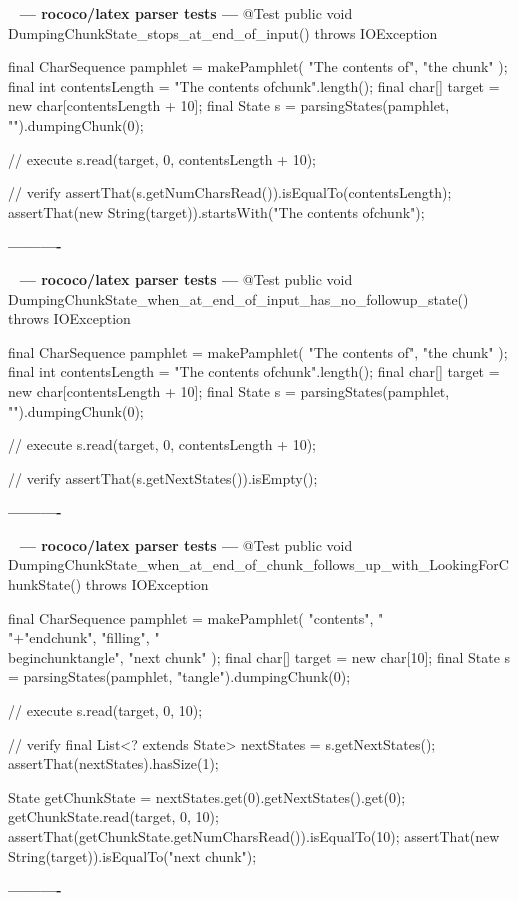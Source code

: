 \documentclass{book}
\newenvironment{chunk}[1]{%
{\ }\newline\noindent%
\hbox{\hskip 2.0cm}{\bf --- #1 ---}%
\verbatim}%                               say exactly what we see
{\endverbatim%
\par{}%
\noindent{}%
\hbox{\hskip 2.0cm}{\bf ----------}%
\par%
\normalsize\noindent}%
\begin{document}
\begin{chunk}{rococo/latex parser tests}
@Test
public void DumpingChunkState_stops_at_end_of_input() throws IOException {
    final CharSequence pamphlet = makePamphlet(
            "The contents of",
            "the chunk"
    );
    final int contentsLength = "The contents of\nthe chunk\n".length();
    final char[] target = new char[contentsLength + 10];
    final State s = parsingStates(pamphlet, "").dumpingChunk(0);

    // execute
    s.read(target, 0, contentsLength + 10);

    // verify
    assertThat(s.getNumCharsRead()).isEqualTo(contentsLength);
    assertThat(new String(target)).startsWith("The contents of\nthe chunk\n");
}
\end{chunk}

\begin{chunk}{rococo/latex parser tests}
@Test
public void DumpingChunkState_when_at_end_of_input_has_no_followup_state() throws IOException {
    final CharSequence pamphlet = makePamphlet(
            "The contents of",
            "the chunk"
    );
    final int contentsLength = "The contents of\nthe chunk\n".length();
    final char[] target = new char[contentsLength + 10];
    final State s = parsingStates(pamphlet, "").dumpingChunk(0);

    // execute
    s.read(target, 0, contentsLength + 10);

    // verify
    assertThat(s.getNextStates()).isEmpty();
}
\end{chunk}

\begin{chunk}{rococo/latex parser tests}
@Test
public void DumpingChunkState_when_at_end_of_chunk_follows_up_with_LookingForChunkState() throws IOException {
    final CharSequence pamphlet = makePamphlet(
            "contents",
            "\\"+"end{chunk}",
            "filling",
            "\\begin{chunk}{tangle}",
            "next chunk"
    );
    final char[] target = new char[10];
    final State s = parsingStates(pamphlet, "tangle").dumpingChunk(0);

    // execute
    s.read(target, 0, 10);

    // verify
    final List<? extends State> nextStates = s.getNextStates();
    assertThat(nextStates).hasSize(1);

    State getChunkState = nextStates.get(0).getNextStates().get(0);
    getChunkState.read(target, 0, 10);
    assertThat(getChunkState.getNumCharsRead()).isEqualTo(10);
    assertThat(new String(target)).isEqualTo("next chunk");
}
\end{chunk}
\end{document}
